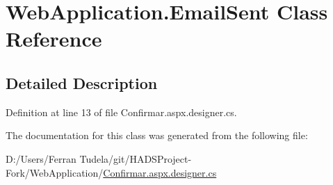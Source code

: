 \hypertarget{classWebApplication_1_1EmailSent}{}\section{Web\+Application.\+Email\+Sent Class Reference}
\label{classWebApplication_1_1EmailSent}


\subsection{Detailed Description}


Definition at line 13 of file Confirmar.\+aspx.\+designer.\+cs.



The documentation for this class was generated from the following file\+:\begin{DoxyCompactItemize}
\item 
D\+:/\+Users/\+Ferran Tudela/git/\+H\+A\+D\+S\+Project-\/\+Fork/\+Web\+Application/\mbox{\hyperlink{Confirmar_8aspx_8designer_8cs}{Confirmar.\+aspx.\+designer.\+cs}}\end{DoxyCompactItemize}
